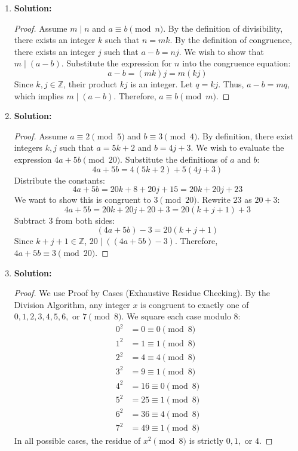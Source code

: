 \documentclass{article}
\begin{document}
\begin{enumerate}
    \item \textbf{Solution:}
    \begin{proof}
        Assume $m \mid n$ and $a \equiv b \pmod n$. By the definition of divisibility, there exists an integer $k$ such that $n = mk$. By the definition of congruence, there exists an integer $j$ such that $a - b = nj$. We wish to show that $m \mid (a - b)$. Substitute the expression for $n$ into the congruence equation:
        \[ a - b = (mk)j = m(kj) \]
        Since $k, j \in \mathbb{Z}$, their product $kj$ is an integer. Let $q = kj$. Thus, $a - b = mq$, which implies $m \mid (a - b)$. Therefore, $a \equiv b \pmod m$.
    \end{proof}

    \item \textbf{Solution:}
    \begin{proof}
        Assume $a \equiv 2 \pmod 5$ and $b \equiv 3 \pmod 4$. By definition, there exist integers $k, j$ such that $a = 5k + 2$ and $b = 4j + 3$. We wish to evaluate the expression $4a + 5b \pmod{20}$. Substitute the definitions of $a$ and $b$:
        \[ 4a + 5b = 4(5k + 2) + 5(4j + 3) \]
        Distribute the constants:
        \[ 4a + 5b = 20k + 8 + 20j + 15 = 20k + 20j + 23 \]
        We want to show this is congruent to $3 \pmod{20}$. Rewrite $23$ as $20 + 3$:
        \[ 4a + 5b = 20k + 20j + 20 + 3 = 20(k + j + 1) + 3 \]
        Subtract 3 from both sides:
        \[ (4a + 5b) - 3 = 20(k + j + 1) \]
        Since $k + j + 1 \in \mathbb{Z}$, $20 \mid ((4a + 5b) - 3)$. Therefore, $4a + 5b \equiv 3 \pmod{20}$.
    \end{proof}

    \item \textbf{Solution:}
    \begin{proof}
        We use Proof by Cases (Exhaustive Residue Checking). By the Division Algorithm, any integer $x$ is congruent to exactly one of $0, 1, 2, 3, 4, 5, 6, \text{ or } 7 \pmod 8$. We square each case modulo 8:
        \begin{align*}
            0^2 &= 0 \equiv 0 \pmod 8 \\
            1^2 &= 1 \equiv 1 \pmod 8 \\
            2^2 &= 4 \equiv 4 \pmod 8 \\
            3^2 &= 9 \equiv 1 \pmod 8 \\
            4^2 &= 16 \equiv 0 \pmod 8 \\
            5^2 &= 25 \equiv 1 \pmod 8 \\
            6^2 &= 36 \equiv 4 \pmod 8 \\
            7^2 &= 49 \equiv 1 \pmod 8
        \end{align*}
        In all possible cases, the residue of $x^2 \pmod 8$ is strictly $0, 1, \text{ or } 4$.
    \end{proof}


\end{enumerate}
\end{document}
